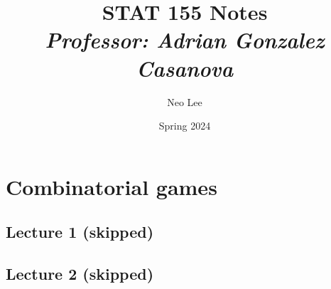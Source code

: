 \documentclass{book}
\title{\Huge{STAT 155 Notes}\\\emph{Professor: Adrian Gonzalez Casanova}}
\author{\huge{Neo Lee}}
\date{\huge{Spring 2024}}
\begin{document}
\maketitle
\let\cleardoublepage\clearpage
{}
\tableofcontents

\chapter{Combinatorial games}
\section{Lecture 1 (skipped)}
\section{Lecture 2 (skipped)}
\end{document}
